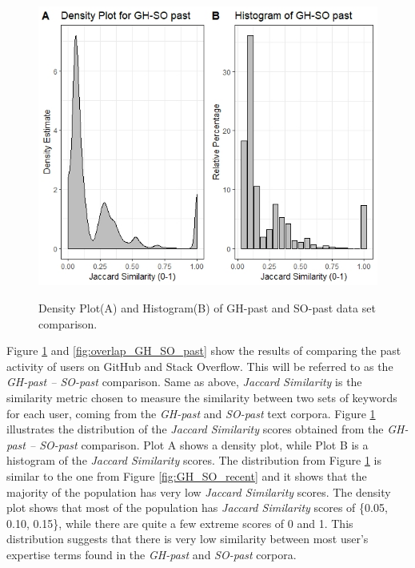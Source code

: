         \begin{figure}
          \centering
          \includegraphics[width=\textwidth]{figures/GH_SO_past.jpeg}\\
          \caption{Density Plot(A) and Histogram(B) of GH-past and SO-past data set comparison.}
          \label{fig:GH_SO_past}
        \end{figure}
        
        Figure \ref{fig:GH_SO_past} and \ref{fig:overlap_GH_SO_past} show the results of comparing the past activity of users on GitHub and Stack Overflow. This will be referred to as the \emph{GH-past -- SO-past} comparison. Same as above, \emph{Jaccard Similarity} is the similarity metric chosen to measure the similarity between two sets of keywords for each user, coming from the \emph{GH-past} and \emph{SO-past} text corpora. Figure \ref{fig:GH_SO_past} illustrates the distribution of the \emph{Jaccard Similarity} scores obtained from the \emph{GH-past -- SO-past} comparison. Plot A shows a density plot, while Plot B is a  histogram of the \emph{Jaccard Similarity} scores. The distribution from Figure \ref{fig:GH_SO_past} is similar to the one from Figure \ref{fig:GH_SO_recent} and it shows that the majority of the population has very low \emph{Jaccard Similarity} scores. The density plot shows that most of the population has \emph{Jaccard Similarity} scores of \{0.05, 0.10, 0.15\}, while there are quite a few extreme scores of 0 and 1. This distribution suggests that there is very low similarity between most user's expertise terms found in the \emph{GH-past} and \emph{SO-past} corpora. 
        
